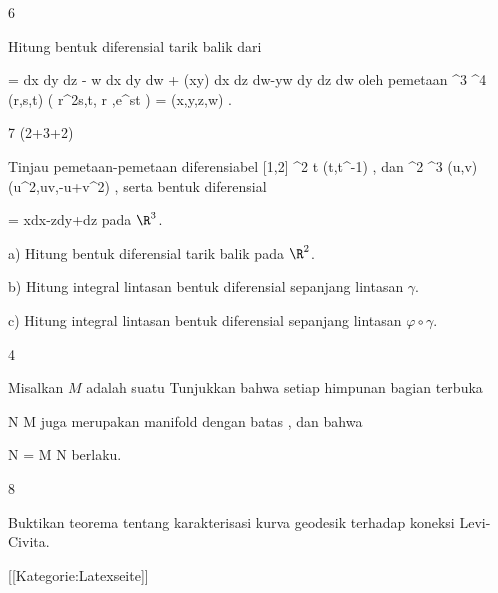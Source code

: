 {6}
{

Hitung bentuk diferensial tarik balik
\mathl{\varphi^* \tau}{} dari

\mavergleichskettedisp
{\vergleichskette
{ \tau
}
{ =} { dx \wedge dy \wedge dz - w dx \wedge dy \wedge dw + \cos (xy)  dx \wedge dz \wedge dw-yw dy \wedge dz \wedge dw
}
{ } {
}
{ } {
}
{ } {
}
}
{}{}{}
oleh pemetaan
\maabbeledisp {\varphi} { \R^3 } { \R^4
} { (r,s,t) } {  \left(  r^2s,t, \sin  r ,e^{st}  \right)  = (x,y,z,w)
} {.}

}
{} {}

{7 (2+3+2)}
{

Tinjau pemetaan-pemetaan diferensiabel
\maabbeledisp {\gamma} { [1,2] } {\R^2
} { t } {(t,t^{-1})
} {,}
dan
\maabbeledisp {\varphi} {\R^2} {\R^3
} {(u,v)} {(u^2,uv,-u+v^2)
} {,}
serta bentuk diferensial

\mavergleichskettedisp
{\vergleichskette
{ \omega
}
{ =} { xdx-zdy+dz
}
{ } {
}
{ } {
}
{ } {
}
}
{}{}{}
pada $\R^3$.

a) Hitung bentuk diferensial tarik balik
\mathl{\varphi^* \omega}{} pada $\R^2$.

b) Hitung integral lintasan bentuk diferensial
\mathl{\varphi^* \omega}{} sepanjang lintasan $\gamma$.

c) Hitung
 {} {}
integral lintasan bentuk diferensial
\mathl{\omega}{} sepanjang lintasan $\varphi \circ \gamma$.

}
{} {}

{4}
{

Misalkan $M$ adalah suatu
Tunjukkan bahwa setiap himpunan bagian terbuka

\mavergleichskette
{\vergleichskette
{ N
}
{ \subseteq }{ M
}
{  }{
}
{    }{
}
{   }{
}
}
{}{}{}
juga merupakan manifold dengan batas
 {} {},
dan bahwa

\mavergleichskettedisp
{\vergleichskette
{ \partial N
}
{ =} { \partial M \cap N
}
{ } {
}
{ } {
}
{ } {
}
}
{}{}{}
berlaku.

}
{} {}

{8}
{

Buktikan teorema tentang karakterisasi kurva geodesik terhadap koneksi Levi-Civita.

}
{} {}

 [[Kategorie:Latexseite]]
